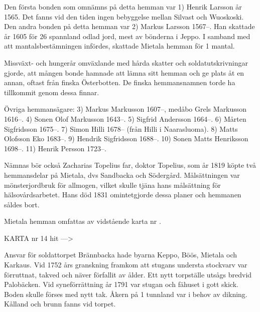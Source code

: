 
Den första bonden som omnämns på detta hemman var 1) Henrik Larsson år 1565. Det fanns vid den tiden ingen bebyggelse mellan Silvast och Wuoskoski. Den andra bonden på detta hemman var 2) Markus Larsson 1567--. Han skattade år 1605 för 26 spannland odlad jord, mest av bönderna i Jeppo. I samband med att mantalsbestämningen infördes, skattade Mietala hemman för 1 mantal.

Missväxt- och hungerår omväxlande med hårda skatter och soldatutskrivningar gjorde, att mången bonde hamnade att lämna sitt hemman och ge plats åt en annan, oftast från finska Österbotten. De finska hemmansnamnen torde ha tillkommit genom dessa finnar.

Övriga hemmansägare:  3) Markus Markusson 1607--, medåbo Grels Markusson 1616--. 4) Sonen Olof Markusson 1643--. 5) Sigfrid Andersson 1664--. 6) Mårten Sigfridsson 1675--. 7) Simon Hilli 1678-- (från Hilli i Naarasluoma). 8) Matts Olofsson Eko 1683--. 9) Hendrik Sigfridsson 1688--. 10) Sonen Matts Henriksson 1698--. 11) Henrik Persson 1723--.

Nämnas bör också  Zacharias Topelius far, doktor Topelius, som år 1819 köpte två hemmansdelar på Mietala, dvs Sandbacka och Södergård. Målsättningen var mönsterjordbruk för allmogen, vilket skulle tjäna hans målsättning för hälsovårdsarbetet. Hans död 1831 omintetgjorde dessa planer och hemmanen såldes bort.


Mietala hemman omfattas av vidstående karta nr .


KARTA nr 14 hit --->





Ansvar för soldattorpet Brännbacka hade byarna Keppo, Böös, Mietala och Karkaus. Vid 1752 års granskning framkom att stugans understa stockvarv var förruttnat, takved och näver förfallit av ålder. Ett nytt torpställe utsågs bredvid Palobäcken. Vid syneförrättning år 1791 var stugan och fähuset i gott skick. Boden skulle förses med nytt tak. Åkern på 1
tunnland var i behov av dikning. Kålland och brunn fanns vid torpet.

